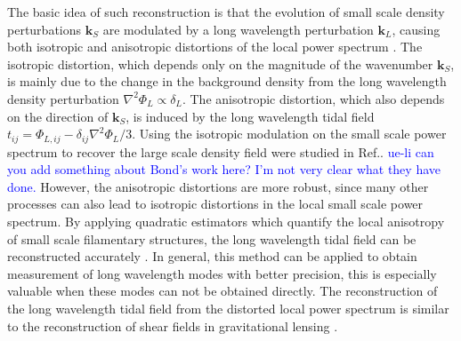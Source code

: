 \documentclass[aps,prd,twocolumn,showpacs,superscriptaddress,groupedaddress,nofootinbib]{revtex4}  %
\begin{document}
The basic idea of such reconstruction is that the evolution of 
small scale density perturbations $\bm{k}_S$ are modulated by a long
wavelength perturbation $\bm{k}_L$, causing both isotropic and anisotropic
distortions of the local power spectrum \cite{2014:tidal}. 
The isotropic distortion, which depends only on the magnitude of the 
wavenumber $\bm{k}_S$, is mainly due to the change in the background density 
from the long wavelength density perturbation $\nabla^2\Phi_{L}\propto\delta_L$.
The anisotropic distortion, which also depends on the direction of $\bm{k}_S$,
is induced by the long wavelength tidal field 
$t_{ij}=\Phi_{L,ij}-\delta_{ij}\nabla^2\Phi_{L}/3$.
Using the isotropic modulation on the small scale power spectrum to recover
the large scale density field were studied in Ref.\cite{2014li}.
\textcolor{blue}{ue-li can you add something about Bond's work here?
I'm not very clear what they have done.}
However, the anisotropic distortions are more robust, since many other 
processes can also lead to isotropic distortions in the local small scale 
power spectrum. By applying quadratic estimators which quantify the local 
anisotropy of small scale filamentary structures, the long wavelength 
tidal field can be reconstructed accurately \cite{2012:pen}.
In general, this method can be applied to obtain measurement of long wavelength 
modes with better precision, this is especially valuable when these modes can not be 
obtained directly. 
The reconstruction of the long wavelength tidal field from the distorted local 
power spectrum is similar to the reconstruction of 
shear fields in gravitational lensing \cite{2008:lu,2010lu}.
\end{document}
